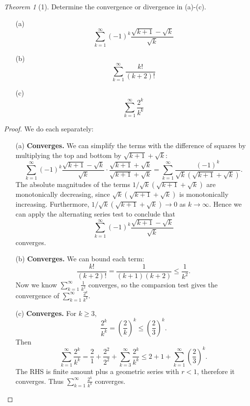 \documentclass[12pt]{article}
\theoremstyle{remark}
\theoremstyle{named}
\newtheorem*{theorem}{Theorem}
\begin{document}
\begin{theorem}[1]
    Determine the convergence or divergence in (a)-(c).
    \begin{enumerate}
        \item[(a)] 
        \[\sum_{k = 1}^\infty (-1)^k \frac{\sqrt{k + 1} - \sqrt{k}}{\sqrt{k}}\]
        \item[(b)] \[\sum_{k = 1}^\infty \frac{k!}{(k + 2)!}\]
        \item[(c)] \[\sum_{k = 1}^\infty \frac{2^k}{k^k}\]
    \end{enumerate}
\end{theorem}

\begin{proof}
    We do each separately:
    \begin{enumerate}
        \item[(a)] \textbf{Converges.} We can simplify the terms with the difference of squares by multiplying the top and bottom by \(\sqrt{k + 1} + \sqrt{k}\):
        \[\sum_{k = 1}^\infty (-1)^k \frac{\sqrt{k + 1} - \sqrt{k}}{\sqrt{k}} \cdot \frac{\sqrt{k + 1} + \sqrt{k}}{\sqrt{k + 1} + \sqrt{k}} = \sum_{k = 1}^\infty \frac{(-1)^k}{\sqrt{k}(\sqrt{k + 1} + \sqrt{k})}.\] 
        The absolute magnitudes of the terms \(1 / \sqrt{k}(\sqrt{k + 1} + \sqrt{k})\) are monotonically decreasing, since \(\sqrt{k}(\sqrt{k + 1} + \sqrt{k})\) is monotonically increasing. Furthermore, \(1 / \sqrt{k}(\sqrt{k + 1} + \sqrt{k}) \to 0\) as \(k \to \infty\). Hence we can apply the alternating series test to conclude that 
        \[\sum_{k = 1}^\infty (-1)^k \frac{\sqrt{k + 1} - \sqrt{k}}{\sqrt{k}}\]
        converges.
        \item[(b)] \textbf{Converges.} We can bound each term:
        \[\frac{k!}{(k+2)!} = \frac{1}{(k + 1)(k + 2)} \le \frac{1}{k^2}.\] 
        Now we know \(\sum_{k = 1}^\infty \frac{1}{k^2}\) converges, so the comparsion test gives the convergence of \(\sum_{k = 1}^\infty \frac{2^k}{k^k}\).
        \item[(c)] \textbf{Converges.} For \(k \ge 3\), 
        \[\frac{2^k}{k^k} = \left(\frac{2}{k}\right)^k \le \left(\frac{2}{3}\right)^k.\] 
        Then 
        \[\sum_{k = 1}^\infty \frac{2^k}{k^k} = \frac{2}{1} + \frac{2^2}{2^2} + \sum_{k = 3}^\infty \frac{2^k}{k^k} \le 2 + 1 + \sum_{k = 1}^\infty \left(\frac{2}{3}\right)^k.\]
        The RHS is finite amount plus a geometric series with \(r < 1\), therefore it converges. Thus \(\sum_{k = 1}^\infty \frac{2^k}{k^k}\) converges.
    \end{enumerate}
\end{proof}
\end{document}

